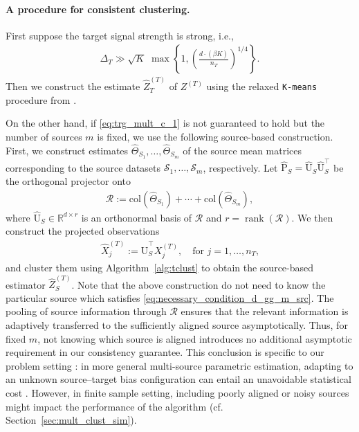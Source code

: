 \documentclass[10pt]{article}
\newcommand{\R}{\mathbb R}
\newcommand{\col}{\mathrm{col}}
\newcommand{\wh}{\widehat}
\newcommand{\trg}{T}
\newcommand{\nT}{n_{\trg}}
\newcommand{\Xtar}{X^{(\trg)}}
\newcommand{\Ztar}{Z^{(\trg)}}
\newcommand{\DeltaT}{\Delta_{\trg}}
\newcommand{\hatXtar}{\wh{X}^{(\trg)}}
\newcommand{\hatZtar}{\wh{Z}^{(\trg)}}
\newcommand{\calS}{\mathcal S}
\newcommand{\src}{S}
\newcommand{\hatThetaS}[1]{\wh{\Theta}_{S_{#1}}}
\newcommand{\Pest}{\wh{\mathrm P}}
\begin{document}
\paragraph{A procedure for consistent clustering.}
First suppose the target signal strength is strong, i.e.,
\begin{align}
\label{eq:trg_mult_c_1}
    \DeltaT \gg \sqrt{K}\;\max\left\{1,
    \left(\frac{d \cdot (\beta K)}{\nT}\right)^{1/4} \right\}.
\end{align}
Then we construct the estimate $\hatZtar_T$ of $\Ztar$ using the relaxed \texttt{K-means} procedure from \cite{giraud2019partial}.

On the other hand, if \eqref{eq:trg_mult_c_1} is not guaranteed to hold but the number of sources $m$ is fixed, we use the following source-based construction. First, we construct estimates $\hatThetaS{1},\ldots,\hatThetaS{m}$ of the source mean matrices
corresponding to the source datasets $\calS_1,\ldots,\calS_m$, respectively. Let $\Pest_\src=\wh{\mathrm U}_\src\wh{\mathrm U}^\top_\src$ be the orthogonal projector onto
\begin{align}
\label{eq:cal_r_b}
    \mathcal R:=\col(\hatThetaS{1})+\cdots+\col(\hatThetaS{m}),
\end{align}
where $\wh{\mathrm U}_\src \in \R^{d \times r}$ is an orthonormal basis of $\mathcal R$ and $r=\operatorname{rank}(\mathcal R)$. 
We then construct the projected observations
\begin{align}
\label{eq:mult_clust_project_data}
    \hatXtar_j:= \wh{\mathrm U}^\top_\src \Xtar_j, \quad \mbox{for $j=1,\ldots,\nT$,}
\end{align}
and cluster them using Algorithm~\ref{alg:tclust} to obtain the source-based estimator $\hatZtar_\src$. Note that the above construction do not need to know the particular source which satisfies \eqref{eq:necessary_condition_d_gg_m_src}. The pooling of source information through $\mathcal R$ ensures that the relevant information is adaptively transferred to the sufficiently aligned source asymptotically. Thus, for fixed $m$, not knowing which source is aligned introduces no additional asymptotic requirement in our consistency guarantee. This conclusion is specific to our problem setting : in more general multi-source parametric estimation, adapting to an unknown source--target bias configuration can entail an unavoidable statistical cost \citep{chakraborty2026statistical}. However, in finite sample setting, including poorly aligned or noisy sources might impact the performance of the algorithm (cf. Section~\ref{sec:mult_clust_sim}).
\end{document}
